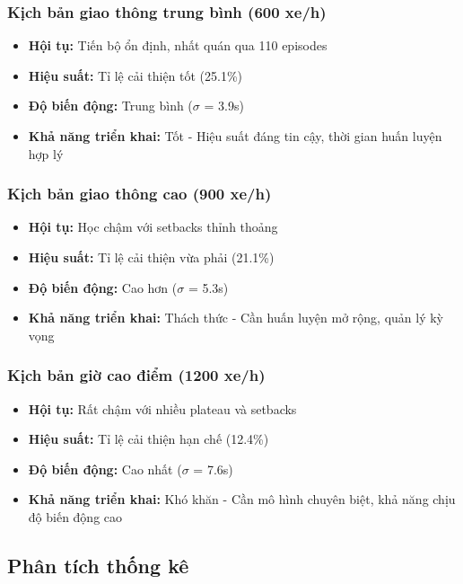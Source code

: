 \subsubsection{Kịch bản giao thông trung bình (600 xe/h)}
\begin{itemize}
    \item \textbf{Hội tụ:} Tiến bộ ổn định, nhất quán qua 110 episodes
    \item \textbf{Hiệu suất:} Tỉ lệ cải thiện tốt (25.1\%)
    \item \textbf{Độ biến động:} Trung bình ($\sigma$ = 3.9s)
    \item \textbf{Khả năng triển khai:} Tốt - Hiệu suất đáng tin cậy, thời gian huấn luyện hợp lý
\end{itemize}

\subsubsection{Kịch bản giao thông cao (900 xe/h)}
\begin{itemize}
    \item \textbf{Hội tụ:} Học chậm với setbacks thỉnh thoảng
    \item \textbf{Hiệu suất:} Tỉ lệ cải thiện vừa phải (21.1\%)
    \item \textbf{Độ biến động:} Cao hơn ($\sigma$ = 5.3s)
    \item \textbf{Khả năng triển khai:} Thách thức - Cần huấn luyện mở rộng, quản lý kỳ vọng
\end{itemize}

\subsubsection{Kịch bản giờ cao điểm (1200 xe/h)}
\begin{itemize}
    \item \textbf{Hội tụ:} Rất chậm với nhiều plateau và setbacks
    \item \textbf{Hiệu suất:} Tỉ lệ cải thiện hạn chế (12.4\%)
    \item \textbf{Độ biến động:} Cao nhất ($\sigma$ = 7.6s)
    \item \textbf{Khả năng triển khai:} Khó khăn - Cần mô hình chuyên biệt, khả năng chịu độ biến động cao
\end{itemize}

\subsection{Phân tích thống kê}

